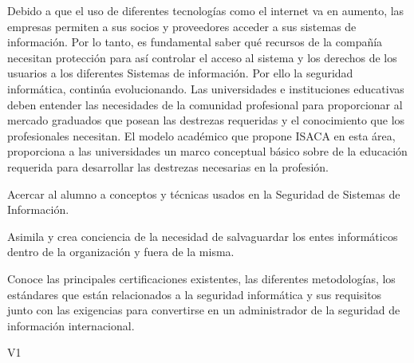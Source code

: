 \begin{syllabus}
\begin{justification}
    Debido a que el uso de diferentes tecnologías como el internet va en aumento, las empresas permiten a sus socios y proveedores acceder a sus sistemas de información. Por lo tanto, es fundamental saber qué recursos de la compañía necesitan protección para así­ controlar el acceso al sistema y los derechos de los usuarios a los diferentes Sistemas de información.  Por ello la seguridad informática, continúa evolucionando. Las universidades e instituciones educativas deben entender las necesidades de la comunidad profesional para proporcionar al mercado graduados que posean las destrezas requeridas y el conocimiento que los profesionales necesitan. El modelo académico que propone  ISACA en esta área, proporciona a las universidades un marco conceptual básico sobre de la educación requerida para desarrollar las destrezas necesarias en la profesión.
    \end{justification}
    
    \begin{goals}
    \item Acercar al alumno a conceptos y técnicas usados en la Seguridad de Sistemas de Información.
    \item Asimila y crea conciencia de la necesidad de salvaguardar los entes informáticos dentro de la organización y fuera de la misma.
    \item Conoce las principales certificaciones existentes, las diferentes metodologías, los estándares que están relacionados a la seguridad informática y sus requisitos junto con las exigencias para convertirse en un administrador de la seguridad de información internacional.
    \end{goals}
    
    \begin{outcomes}{V1}
        \item {}
        \item {}
        \item {}
        \item {}
        \item {}
        \item {}
        \item {}
        \item {}
    \end{outcomes}
    

\end{syllabus}
